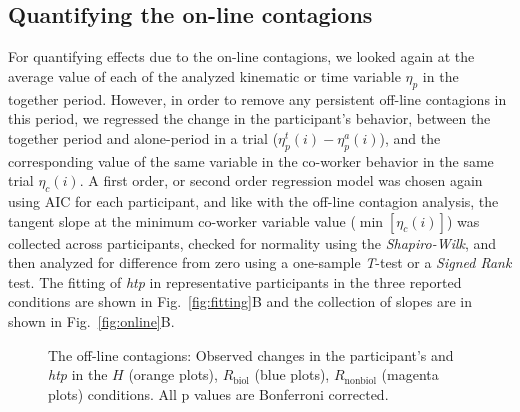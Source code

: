 \documentclass[a4paper, 12pt, oneside]{Thesis}  %
\begin{document}
\subsection{Quantifying the on-line contagions}
For quantifying effects due to the on-line contagions, we looked again at the average value of each of the analyzed kinematic or time variable $\eta_p$ in the together period. However, in order to remove any persistent off-line contagions in this period, we regressed the change in the participant's behavior, between the together period and alone-period in a trial ($\eta_p^t (i)- \eta_p^a (i)$), and the corresponding value of the same variable in the co-worker behavior in the same trial $\eta_c(i)$. A first order, or second order regression model was chosen again using AIC for each participant, and like with the off-line contagion analysis, the tangent slope at the minimum co-worker variable value ($\min[\eta_c(i)]$) was collected across participants, checked for normality using the {\it Shapiro-Wilk}, and then analyzed for difference from zero using a one-sample {\it T}-test or a {\it Signed Rank} test. The fitting of {\it htp} in representative participants in the three reported conditions are shown in Fig.~\ref{fig:fitting}B and the collection of slopes are in shown in Fig.~\ref{fig:online}B.

\begin{figure}[t]
	\caption{The off-line contagions: Observed changes in the participant's  and \textit{htp} in the $\textit{H}$ (orange plots), $\textit{R}_{\text{biol}}$ (blue plots), $\textit{R}_{\text{nonbiol}}$ (magenta plots) conditions. All p values are Bonferroni corrected.}
	\label{fig:offline}
\end{figure}
\end{document}
